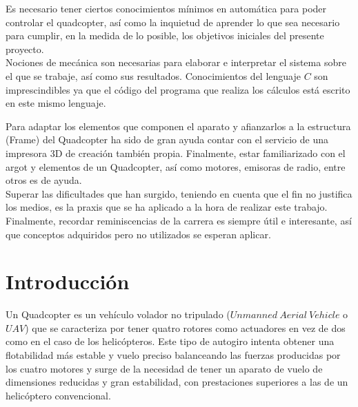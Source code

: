 \documentclass[twoside,11pt]{book}
\begin{document}
Es necesario tener ciertos conocimientos mínimos en automática para poder controlar el quadcopter, así como la inquietud de aprender lo que sea necesario para cumplir, en la medida de lo posible, los objetivos iniciales del presente proyecto. \\

Nociones de mecánica son necesarias para elaborar e interpretar el sistema sobre el que se trabaje, así como sus resultados. Conocimientos del lenguaje $C$ son imprescindibles ya que el código del programa que realiza los cálculos está escrito en este mismo lenguaje. 

Para adaptar los elementos que componen el aparato y afianzarlos a la estructura (Frame)  del Quadcopter ha sido de gran ayuda contar con el servicio de una impresora 3D de creación también propia. Finalmente, estar familiarizado con el argot y elementos de un Quadcopter, así como motores, emisoras de radio, entre otros es de ayuda. \\

Superar las dificultades que han surgido, teniendo en cuenta que el fin no justifica los medios, es la praxis que se ha aplicado a la hora de realizar este trabajo. Finalmente, recordar reminiscencias de la carrera es siempre útil e interesante, así que conceptos adquiridos pero no utilizados se esperan aplicar.
 
\newpage
\chapter{Introducción} \label{intro}

Un Quadcopter es un vehículo volador no tripulado ($Unmanned \>Aerial\>Vehicle$ o $UAV$) que se caracteriza por tener quatro rotores como actuadores en vez de dos como en el caso de los helicópteros. Este tipo de autogiro intenta obtener una flotabilidad más estable y vuelo preciso balanceando las fuerzas producidas por los cuatro motores y surge de la necesidad de tener un aparato de vuelo de dimensiones reducidas y gran estabilidad, con prestaciones superiores a las de un helicóptero convencional. \\
\end{document}
